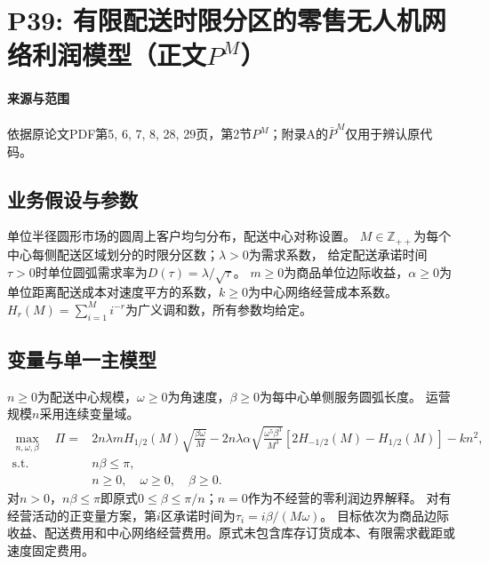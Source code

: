 \documentclass[UTF8,11pt]{ctexart}
\begin{document}
\section*{P39: 有限配送时限分区的零售无人机网络利润模型（正文$P^M$）}
\paragraph{来源与范围}依据原论文PDF第5, 6, 7, 8, 28, 29页，第2节$P^M$；附录A的$\bar P^M$仅用于辨认原代码。

\subsection*{业务假设与参数}
单位半径圆形市场的圆周上客户均匀分布，配送中心对称设置。
$M\in\mathbb Z_{++}$为每个中心每侧配送区域划分的时限分区数；$\lambda>0$为需求系数，
给定配送承诺时间$\tau>0$时单位圆弧需求率为$D(\tau)=\lambda/\sqrt\tau$。
$m\ge0$为商品单位边际收益，$\alpha\ge0$为单位距离配送成本对速度平方的系数，$k\ge0$为中心网络经营成本系数。
$H_r(M)=\sum_{i=1}^M i^{-r}$为广义调和数，所有参数均给定。
\subsection*{变量与单一主模型}
$n\ge0$为配送中心规模，$\omega\ge0$为角速度，$\beta\ge0$为每中心单侧服务圆弧长度。
运营规模$n$采用连续变量域。
\begin{align}
\max_{n,\omega,\beta}\quad
\Pi={}&2n\lambda mH_{1/2}(M)\sqrt{\frac{\beta\omega}{M}}
-2n\lambda\alpha\sqrt{\frac{\omega^5\beta^3}{M^3}}
\left[2H_{-1/2}(M)-H_{1/2}(M)\right]-kn^2,\tag{$P^M$}\\
\text{s.t.}\quad &n\beta\le\pi,\\
&n\ge0,\quad\omega\ge0,\quad\beta\ge0.
\end{align}
对$n>0$，$n\beta\le\pi$即原式$0\le\beta\le\pi/n$；$n=0$作为不经营的零利润边界解释。
对有经营活动的正变量方案，第$i$区承诺时间为$\tau_i=i\beta/(M\omega)$。
目标依次为商品边际收益、配送费用和中心网络经营费用。原式未包含库存订货成本、有限需求截距或速度固定费用。
\end{document}
